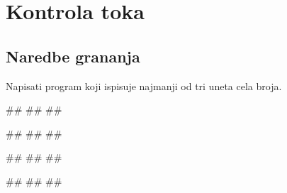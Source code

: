 \chapter{Kontrola toka}


\section{Naredbe grananja}


\begin{Exercise}[label=KT_NG_01] 
Napisati program koji ispisuje najmanji od tri uneta cela broja.

\begin{miditest}
\begin{upotreba}{1}
#\naslovInt#
##
##
\end{upotreba}
\end{miditest}
\begin{miditest}
\begin{upotreba}{2}
#\naslovInt#
##
##
\end{upotreba}
\end{miditest}

\begin{miditest}
\begin{upotreba}{3}
#\naslovInt#
##
##
\end{upotreba}
\end{miditest}
\begin{miditest}
\begin{upotreba}{4}
#\naslovInt#
##
##
\end{upotreba}
\end{miditest}

\end{Exercise}
\ifresenja
 \begin{Answer}[ref=KT_NG_01]
\end{Answer}
\fi


